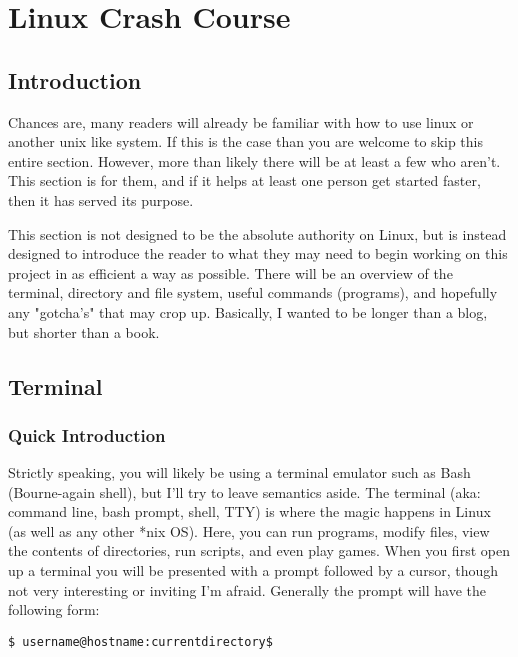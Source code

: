 \section{Linux Crash Course} \mdseries 


\subsection{Introduction} \mdseries 
Chances are, many readers will already be familiar with how to use linux or another unix like system.  If this is the case than you are welcome to skip this entire section. However, more than likely there will be at least a few who aren't.  This section is for them, and if it helps at least one person get started faster, then it has served its purpose.

This section is not designed to be the absolute authority on Linux, but is instead designed to introduce the reader to what they may need to begin working on this project in as efficient a way as possible.  There will be an overview of the terminal, directory and file system, useful commands (programs), and hopefully any "gotcha's" that may crop up.  Basically, I wanted to be longer than a blog, but shorter than a book.
	

\subsection{Terminal}
\subsubsection{Quick Introduction} \mdseries
Strictly speaking, you will likely be using a terminal emulator such as Bash (Bourne-again shell), but I'll try to leave semantics aside.  The terminal (aka: command line, bash prompt, shell, TTY) is where the magic happens in Linux (as well as any other *nix OS).  Here, you can run programs, modify files, view the contents of directories, run scripts, and even play games.  When you first open up a terminal you will be presented with a prompt followed by a cursor, though not very interesting or inviting I'm afraid.  Generally the prompt will have the following form: \\
	
\begin{lstlisting}
$ username@hostname:currentdirectory$
\end{lstlisting}
	
